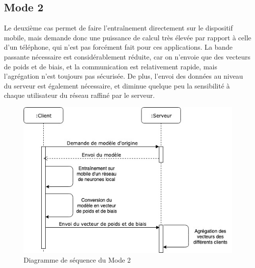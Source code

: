 \documentclass{article}
\begin{document}
\subsection{Mode 2}
Le deuxième cas permet de faire l'entraînement directement sur le dispositif mobile, mais demande donc une puissance de calcul très élevée par rapport à celle d’un téléphone, qui n'est pas forcément fait pour ces applications. La bande passante nécessaire est considérablement réduite, car on n'envoie que des vecteurs de poids et de biais, et la communication est relativement rapide, mais l’agrégation n'est toujours pas sécurisée. De plus, l’envoi des données au niveau du serveur est également nécessaire, et diminue quelque peu la sensibilité à chaque utilisateur du réseau raffiné par le serveur.
    \begin{figure}[H]
    \includegraphics[width=\textwidth]{img/MODE_2_SEQ.jpg}
    \caption{Diagramme de séquence du Mode 2}
    \end{figure}
\end{document}
